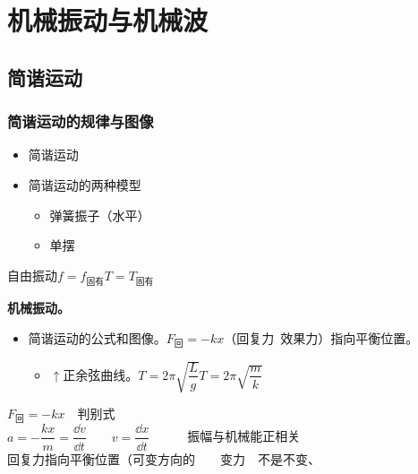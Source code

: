 \chapter{机械振动与机械波}
\label{ch:08}

\section{简谐运动}
\subsection{简谐运动的规律与图像}
\begin{itemize}
\item 简谐运动
\item 简谐运动的两种模型
  \begin{itemize}
  \item 弹簧振子（水平）
  \item 单摆
  \end{itemize}
\end{itemize}
自由振动\quad $f=f_{\text{固有}}$\quad $T=T_{\text{固有}}$

\textbf{机械振动。}
\begin{itemize}
\item 简谐运动的公式和图像。\quad $F_{\text{回}}=-kx$（回复力\ 效果力）指向平衡位置。
  \begin{itemize}
  \item $\uparrow$正余弦曲线。\quad $T=2\pi\sqrt{\dfrac{L}{g}}$\quad $T=2\pi\sqrt{\dfrac{m}{k}}$
  \end{itemize}
\end{itemize}

\quad $F_{\text{回}}=-kx$　判别式\\[0.8ex]
$a=-\dfrac{kx}{m}=\dfrac{\dd v}{\dd t}$　　$v=\dfrac{\dd x}{\dd t}$　　　振幅与机械能正相关\\[0.8ex]
回复力指向平衡位置（可变方向的　　变力　不是不变、

